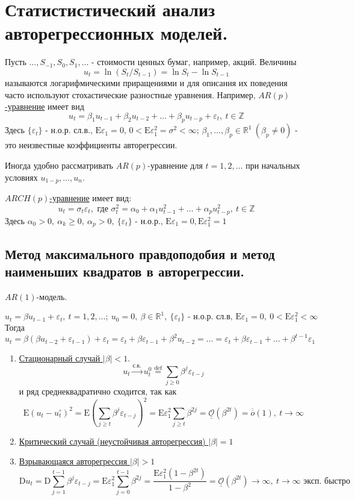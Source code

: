 \documentclass[12pt]{article}
\newcommand*{\defeq}{\stackrel{\text{def}}{=}}
\def\eps{ \varepsilon }
\def\R{ \mathbb{R} }
\def\Z{ \mathbb{Z} }
\def\E{ \mathrm{E} }
\def\D{ \mathrm{D} }
\def\littleO{ \overline{\overline{o}} }
\def\bigO{ \underline{\underline{\mathcal{O}}} }
\begin{document}
\tableofcontents

\newpage





\section{Статистистический анализ авторегрессионных моделей.}

Пусть $\ldots,S_{-1},S_0,S_1,\ldots$ - стоимости ценных бумаг, например, акций.
Величины 
\[u_t=\ln(S_t/S_{t-1})=\ln S_t-\ln S_{t-1}\]
называются логарифмическими приращениями и для описания
их поведения часто используют стохастические разностные
уравнения. Например, \underline{$AR(p)$-уравнение} имеет вид
\[u_t=\beta_1u_{t-1}+\beta_2u_{t-2}+\ldots+\beta_pu_{t-p}+\eps_t,\ t\in\Z\]
Здесь $\{\eps_t\}$ - н.о.р. сл.в., $\E\eps_1=0$, $0<\E\eps_1^2=\sigma^2<\infty$; $\beta_1,\ldots,\beta_p\in\R^1\ (\beta_p\neq0)$ - 
это неизвестные коэффициенты авторегрессии.

Иногда удобно рассматривать $AR(p)$-уравнение для $t=1,2,\ldots$ при начальных условиях
$u_{1-p},\ldots,u_n$.

\underline{$ARCH(p)$-уравнение} имеет вид:
\[u_t=\sigma_t\eps_t,\text{ где } \sigma_t^2=\alpha_0+\alpha_1u_{t-1}^2+\ldots+\alpha_pu_{t-p}^2,\ t\in\Z\]
Здесь $\alpha_0>0,\ \alpha_k\geq0,\ \alpha_p>0,\ \{\eps_t\}$ - н.о.р., $\E\eps_1=0,\E\eps_1^2=1$

\subsection{Метод максимального правдоподобия и метод наименьших квадратов в авторегрессии.}

$AR(1)$-модель.

\begin{equation}\label{def::ar_model}
    u_t=\beta u_{t-1}+\eps_t,\ t=1,2,\ldots;\ u_0=0,\ \beta\in\R^1,\ \{\eps_t\}\text{ - н.о.р. сл.в, }\E\eps_1=0,\ 0<\E\eps_1^2<\infty 
\end{equation}
Тогда
\[u_t=\beta(\beta u_{t-2}+\eps_{t-1})+\eps_t=\eps_t+\beta\eps_{t-1}+\beta^2u_{t-2}=\ldots=\eps_t+\beta\eps_{t-1}+\ldots+\beta^{t-1}\eps_1\]
\begin{enumerate}
    \item \underline{Стационарный случай $\left\lvert \beta\right\rvert <1$}.
    \[u_t\xrightarrow{\mbox{с.к.}}u_t^0\defeq\sum_{j\geq0}\beta^j\eps_{t-j}\]
    и ряд среднеквадратично сходится, так как
    \[\E(u_t-u_t^\circ)^2=\E(\sum_{j\geq t}\beta^j\eps_{t-j})^2=\E\eps_1^2\sum_{j\geq t}\beta^{2j}=\bigO(\beta^{2t})=\littleO(1),\ t\rightarrow\infty\]
    \item \underline{Критический случай (неустойчивая авторегрессия) $\left\lvert \beta\right\rvert =1$}
    \item \underline{Взрывающаяся авторегрессия $\left\lvert \beta\right\rvert >1$}
    \[\D u_t=\D\sum_{j=1}^{t-1}\beta^j\eps_{t-j}=\E\eps^2_1\sum_{j=0}^{t-1}\beta^{2j}=\frac{\E\eps_1^2(1-\beta^{2t})}{1-\beta^2}=\bigO(\beta^{2t})\rightarrow\infty,\ t\rightarrow\infty\text{ эксп. быстро}\]
\end{enumerate}
\end{document}
